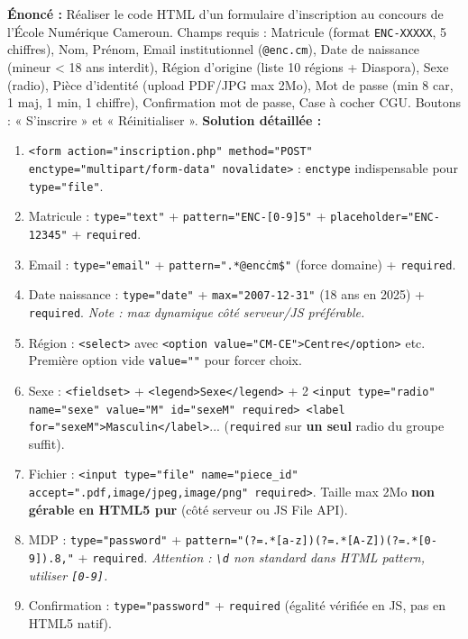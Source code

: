 \documentclass[11pt]{article}
\begin{document}
\begin{exoresolu}
    \textbf{Énoncé :} Réaliser le code HTML d'un formulaire d'inscription au concours de l'École Numérique Cameroun. Champs requis : Matricule (format \texttt{ENC-XXXXX}, 5 chiffres), Nom, Prénom, Email institutionnel (\texttt{@enc.cm}), Date de naissance (mineur < 18 ans interdit), Région d'origine (liste 10 régions + Diaspora), Sexe (radio), Pièce d'identité (upload PDF/JPG max 2Mo), Mot de passe (min 8 car, 1 maj, 1 min, 1 chiffre), Confirmation mot de passe, Case à cocher CGU. Boutons : « S'inscrire » et « Réinitialiser ».
    \tcblower
    \textbf{Solution détaillée :}
    \begin{enumerate}
        \item \texttt{<form action="inscription.php" method="POST" enctype="multipart/form-data" novalidate>} : \texttt{enctype} indispensable pour \texttt{type="file"}.
        \item Matricule : \texttt{type="text"} + \texttt{pattern="ENC-[0-9]{5}"} + \texttt{placeholder="ENC-12345"} + \texttt{required}.
        \item Email : \texttt{type="email"} + \texttt{pattern=".*@enc\.cm\$"} (force domaine) + \texttt{required}.
        \item Date naissance : \texttt{type="date"} + \texttt{max="2007-12-31"} (18 ans en 2025) + \texttt{required}. \textit{Note : max dynamique côté serveur/JS préférable.}
        \item Région : \texttt{<select>} avec \texttt{<option value="CM-CE">Centre</option>} etc. Première option vide \texttt{value=""} pour forcer choix.
        \item Sexe : \texttt{<fieldset>} + \texttt{<legend>Sexe</legend>} + 2 \texttt{<input type="radio" name="sexe" value="M" id="sexeM" required> <label for="sexeM">Masculin</label>}... (\texttt{required} sur \textbf{un seul} radio du groupe suffit).
        \item Fichier : \texttt{<input type="file" name="piece\_id" accept=".pdf,image/jpeg,image/png" required>}. Taille max 2Mo \textbf{non gérable en HTML5 pur} (côté serveur ou JS File API).
        \item MDP : \texttt{type="password"} + \texttt{pattern="(?=.*[a-z])(?=.*[A-Z])(?=.*[0-9]).{8,}"} + \texttt{required}. \textit{Attention : \texttt{\textbackslash d} non standard dans HTML pattern, utiliser \texttt{[0-9]}.}
        \item Confirmation : \texttt{type="password"} + \texttt{required} (égalité vérifiée en JS, pas en HTML5 natif).

\end{enumerate}
\end{exoresolu}
\end{document}
